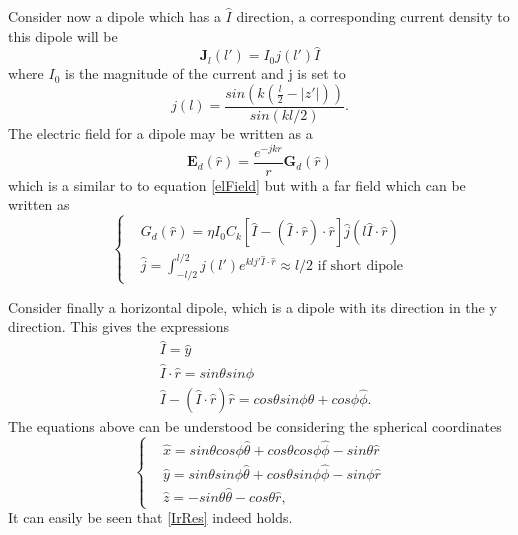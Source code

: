 Consider now a dipole which has a $\hat{I}$ direction, a corresponding current density to this dipole will be 
\begin{equation}
\mathbf{J}_l(l')= I_0 j(l')\hat{I}
\end{equation}
where $I_0$ is the magnitude of the current and j is set to 
\begin{equation}
j(l) = \frac{sin\left(k\left( \frac{l}{2}- |z'|\right)\right)}{sin(kl/2)}.
\end{equation}
The electric field for a dipole may be written as a 
\begin{equation}
\mathbf{E}_d (\hat{r})= \frac{e^{-jkr}}{r}\mathbf{G}_d(\hat{r})
\end{equation}
which is a similar to to equation \eqref{elField} but with a far field which can be written as 
\begin{equation}
\begin{cases}
&  {G}_d(\hat{r}) = \eta I_0C_k[\hat{I}-(\hat{I}\cdot \hat{r})\cdot\hat{r} ]\hat{j}(l\hat{I}\cdot\hat{r}) \\
& \hat{j} = \int_{-l/2}^{l/2}j(l')e^{klj'\hat{I}\cdot\hat{r}} \approx l/2 \text{  if short dipole}
\end{cases}
\end{equation}

Consider finally a horizontal dipole, which is  a dipole with its direction in the y direction. This gives the expressions 
\begin{align}
& \hat{I} = \hat{y} \\
& \hat{I} \cdot \hat{r} = sin\theta sin\phi \\ \label{IrRes}
& \hat{I} -(\hat{I} \cdot \hat{r})\hat{r} = cos\theta sin\phi \hat{\theta} + cos\phi \hat{\phi}. 
\end{align}
The equations above can be understood be considering the spherical coordinates 
\begin{equation}
\begin{cases}
&\hat{x} = sin\theta cos\phi \hat{\theta} + cos\theta cos\phi \hat{\phi} - sin\theta \hat{r} \\
&\hat{y} = sin\theta sin\phi \hat{\theta} + cos\theta sin\phi \hat{\phi} - sin\phi \hat{r} \\
&\hat{z} = -sin\theta  \hat{\theta} - cos\theta \hat{r},
\end{cases}
\end{equation}
It can easily be seen that \eqref{IrRes} indeed holds.



